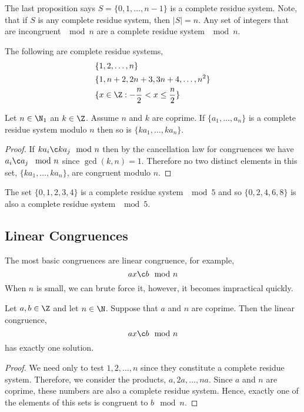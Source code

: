 \begin{nprop}
   The last proposition says $S = \{0,1,\dots, n-1\}$ is a complete residue system. Note, that if $S$ is any complete residue system, then $|S| = n$. Any set of integers that are incongruent $\mod n$ are a complete residue system $\mod n$.
 \end{nprop}

 \begin{eg}
   The following are complete residue systems,
   \begin{align*}
     &\{1, 2,\dots, n\}\\
     &\{1, n+2, 2n+3, 3n+4,\dots, n^2\}\\
     &\{x \in \Z : -\frac{n}{2} < x \le \frac{n}{2}\}
   \end{align*}
 \end{eg}

\begin{nprop}
  Let $n \in \N_1$ an $k \in \Z$. Assume $n$ and $k$ are coprime. If $\{a_1, \dots, a_n\}$ is a complete residue system modulo $n$ then so is $\{ka_1, \dots, ka_n\}$.
\end{nprop}
\begin{proof}
  If $ka_i \c ka_j \mod n$ then by the cancellation law for congruences we have $a_i \c a_j\,\mod n$ since $\gcd(k, n)= 1$. Therefore no two distinct elements in this set, $\{ka_1, \dots, ka_n\}$, are congruent modulo $n$.
\end{proof}

\begin{eg}
  The set $\{0, 1, 2, 3, 4\}$ is a complete residue system $\mod 5$ and so $\{0,2,4,6,8\}$ is also a complete residue system $\mod 5$.
\end{eg}

\subsection{Linear Congruences}
The most basic congruences are linear congruence, for example,
$$ ax \c b \mod n $$
When $n$ is small, we can brute force it, however, it becomes impractical quickly.

\begin{nthm}
  Let $a, b \in \Z$ and let $n \in \N$. Suppose that $a$ and $n$ are coprime. Then the linear congruence,
  $$ ax \c b \mod n $$
  has exactly one solution.
\end{nthm}
\begin{proof}
  We need only to test $1, 2, \dots, n$ since they constitute a complete residue system. Therefore, we consider the products, $a, 2a, \dots, na$. Since $a$ and $n$ are coprime, these numbers are also a complete residue system. Hence, exactly one of the elements of this sets is congruent to $b \mod n$.
\end{proof}

